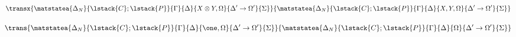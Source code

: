 
\begin{multline}
\transx{
   \matstatea{\Delta_N}{\lstack{C};
      \lstack{P}}{\Gamma}{\Delta}{X \otimes Y, \Omega}{\Delta' \rightarrow
         \Omega'}{\Sigma}
}
{
   \matstatea{\Delta_N}{\lstack{C};
      \lstack{P}}{\Gamma}{\Delta}{X, Y, \Omega}{\Delta' \rightarrow
         \Omega'}{\Sigma}
}
\end{multline}

\[
\trans{
   \matstatea{\Delta_N}{\lstack{C};
      \lstack{P}}{\Gamma}{\Delta}{\one, \Omega}{\Delta' \rightarrow
         \Omega'}{\Sigma}
}
{
   \matstatea{\Delta_N}{\lstack{C};
      \lstack{P}}{\Gamma}{\Delta}{\Omega}{\Delta' \rightarrow
         \Omega'}{\Sigma}
}
\]
